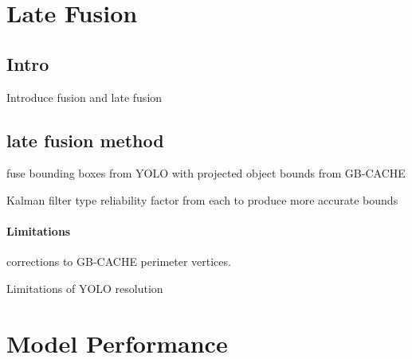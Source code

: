 \documentclass{erauthesis}
\begin{document}




\section{Late Fusion} \label{late_fusion}

\subsection{Intro}
Introduce fusion and late fusion

\subsection{late fusion method}
fuse bounding boxes from YOLO with projected object bounds from GB-CACHE

Kalman filter type reliability factor from each to produce more accurate bounds

\paragraph{Limitations}
corrections to GB-CACHE perimeter vertices.

Limitations of YOLO resolution


\section{Model Performance} \label{performance}


\end{document}
